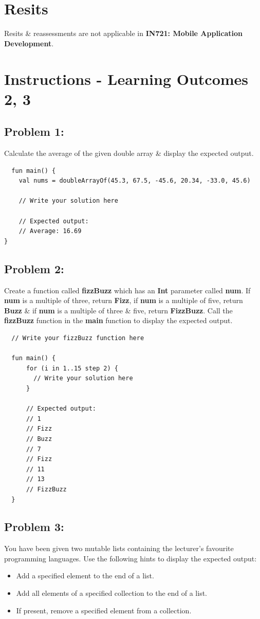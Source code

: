 \documentclass{article}
\begin{document}
\section*{Resits}
Resits \& reassessments are not applicable in \textbf{IN721: Mobile Application Development}.

\section*{Instructions - Learning Outcomes 2, 3}
\subsection*{Problem 1:} 
Calculate the average of the given double array \& display the expected output.

\begin{verbatim}
  fun main() {
    val nums = doubleArrayOf(45.3, 67.5, -45.6, 20.34, -33.0, 45.6)

    // Write your solution here

    // Expected output:
    // Average: 16.69
}
\end{verbatim}

\subsection*{Problem 2:}
Create a function called \textbf{fizzBuzz} which has an \textbf{Int} parameter called \textbf{num}. If \textbf{num} is a multiple of three, return \textbf{Fizz}, if \textbf{num} is a multiple of five, return \textbf{Buzz} \& if \textbf{num} is a multiple of three \& five, return \textbf{FizzBuzz}. Call the \textbf{fizzBuzz} function in the \textbf{main} function to display the expected output.

\begin{verbatim}
  // Write your fizzBuzz function here
  
  fun main() {
      for (i in 1..15 step 2) {
        // Write your solution here
      }

      // Expected output:
      // 1
      // Fizz
      // Buzz
      // 7
      // Fizz
      // 11
      // 13
      // FizzBuzz
  }
\end{verbatim}

\subsection*{Problem 3:} You have been given two mutable lists containing the lecturer's favourite programming languages. Use the following hints to display the expected output:
\begin{itemize}
  \item Add a specified element to the end of a list.
  \item Add all elements of a specified collection to the end of a list.
  \item If present, remove a specified element from a collection.
\end{itemize}
\end{document}
